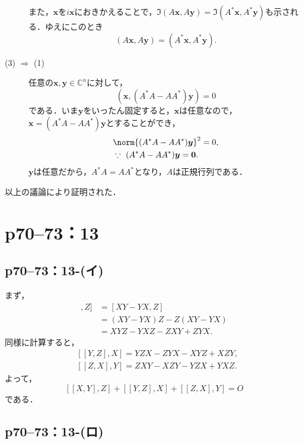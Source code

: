 \begin{tproof}
\begin{description}
          また，$\bm{x}$を$i\bm{x}$におきかえることで，$ \Im (A\bm{x}, A\bm{y}) = \Im (A^\ast \bm{x}, A^\ast\bm{y})$も示される．ゆえにこのとき
          \[
            (A\bm{x}, A\bm{y}) = (A^\ast \bm{x}, A^\ast\bm{y}).
          \]
    \item[(3) $\Longrightarrow$ (1)] 任意の$\bm{x},\bm{y} \in \mathbb{C}^n$に対して，
          \[
            (\bm{x}, (A^\ast A-A A^\ast)\bm{y}) =0
          \]
          である．いま$\bm{y}$をいったん固定すると，$\bm{x}$は任意なので，$\bm{x}=(A^\ast A-A A^\ast)\bm{y}$とすることができ，
          \begin{align*}
             & \norm{(A^\ast A-A A^\ast)\bm{y}}^2  = 0,       \\
             & \because ~ (A^\ast A-A A^\ast)\bm{y} = \bm{0}.
          \end{align*}
          $\bm{y}$は任意だから，$A^\ast A=A A^\ast$となり，$A$は正規行列である．
  \end{description}
  以上の議論により証明された．
\end{tproof}




\section*{p70--73：13}

\subsection*{p70--73：13-(イ)}

\begin{tanswer}
  まず，
  \begin{align*}
    [ [X,Y],Z ] & = [XY-YX,Z]           \\
                & = (XY-YX)Z -Z(XY-YX)  \\
                & = XYZ -YXZ -ZXY +ZYX.
  \end{align*}
  同様に計算すると，
  \begin{align*}
     & [[Y,Z],X] = YZX -ZYX -XYZ +XZY,  \\
     & [ [Z,X],Y] = ZXY -XZY -YZX +YXZ.
  \end{align*}
  よって，
  \[
    [[X,Y],Z] +[[Y,Z],X]+[[Z,X],Y]=O
  \]
  である．
\end{tanswer}


\subsection*{p70--73：13-(ロ)}

